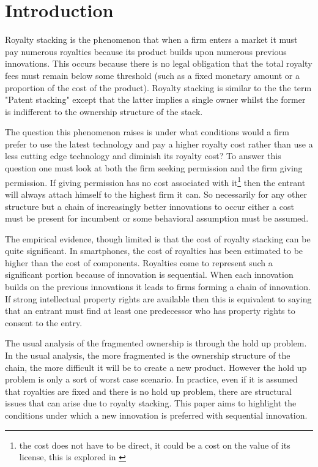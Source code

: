 \documentclass{article}
\begin{document}
\section{Introduction}

Royalty stacking is the phenomenon that when a firm enters a market it must pay numerous royalties because its product builds upon numerous previous innovations. This occurs because there is no legal obligation that the total royalty fees must remain below some threshold (such as a fixed monetary amount or a proportion of the cost of the product). Royalty stacking is similar to the the term "Patent stacking" except that the latter implies a single owner whilst the former is indifferent to the ownership structure of the stack. 

The question this phenomenon raises is under what conditions would a firm prefer to use the latest technology and pay a higher royalty cost rather than use a less cutting edge technology and diminish its royalty cost? To answer this question one must look at both the firm seeking permission and the firm giving permission. If giving permission has no cost associated with it\footnote{ the cost does not have to be direct, it could be a cost on the value of its license, this is explored in \cite{Katz1986} } then the entrant will always attach himself to the highest firm it can. So necessarily for any other structure but a chain of increasingly better innovations to occur either a cost must be present for incumbent or some behavioral assumption must be assumed. 

The empirical evidence, though limited is that the cost of royalty stacking can be quite significant. In smartphones, the cost of royalties has been estimated to be higher than the cost of components. \cite{Armstrong2014} Royalties come to represent such a significant portion because of innovation is sequential. When each innovation builds on the previous innovations it leads to firms forming a chain of innovation. If strong intellectual property rights are available then this is equivalent to saying that an entrant must find at least one predecessor who has property rights to consent to the entry. 

The usual analysis of the fragmented ownership is through the hold up problem.  In the usual analysis, the more fragmented is the ownership structure of the chain, the more difficult it will be to create a new product. However the hold up problem is only a sort of worst case scenario. In practice, even if it is assumed that royalties are fixed and there is no hold up problem, there are structural issues that can arise due to royalty stacking. This paper aims to highlight the conditions under which a new innovation is preferred with sequential innovation. 
\end{document}
